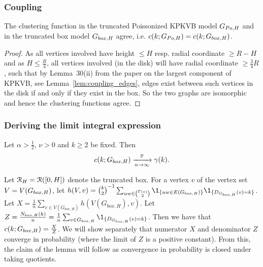 \subsubsection{Coupling}
\begin{lemma}\label{lem:coup}
The clustering function in the truncated Poissonized KPKVB model $G_{Po,H}$ and in the truncated box model $G_{box,H}$ agree, i.e. $c(k;G_{Po,H}) = c(k;G_{box,H})$.
\end{lemma}
\begin{proof}
As all vertices involved have height $\leq H$ resp. radial coordinate $\geq R-H$ and as $H\leq \frac{R}{4}$, all vertices involved (in the disk)  will have radial coordinate $\geq \frac{3}{4}R$, such that by Lemma~30(ii) from the paper on the largest component of KPKVB, see Lemma~\ref{lem:coupling_edges}, edges exist between such vertices in the disk if and only if they exist in the box. So the two graphs are isomorphic and hence the clustering functions agree.
\end{proof}

\subsubsection{Deriving the limit integral expression}
\begin{lemma}\label{lem:lim}
Let $\alpha > \frac{1}{2}$, $\nu>0$ and $k\geq 2$ be fixed. Then
$$c(k;G_{box,H})\xrightarrow[n\rightarrow\infty]{\mathbb{P}}\gamma(k).$$
\end{lemma}

Let ${\mathcal R}_H = {\mathcal R}([0,H])$ denote the truncated box.
For a vertex $v$ of the vertex set $V=V(G_{box,H})$, let $h(V,v) = {k \choose 2}^{-1} \sum_{uw \in {\Gamma(v) \choose 2}} \1_{\{uw \in E(\GboxH)\}} \1_{\{ D_{\GboxH}(v)=k\}}$.
Let $X = \frac{1}{n}\sum_{v \in V(G_{box,H})} h(V(G_{box,H}),v)$. Let $Z = \frac{N_{box,H}(k)}{n} = \frac{1}{n}\sum_{v \in \GboxH} \1_{\{D_{\GboxH}(v)=k\}}$. Then we have that $c(k;G_{box,H}) = \frac{X}{Z}$. We will show separately that numerator $X$ and denominator $Z$ converge in probability (where the limit of $Z$ is a positive constant). From this, the claim of the lemma will follow as convergence in probability is closed under taking quotients.




